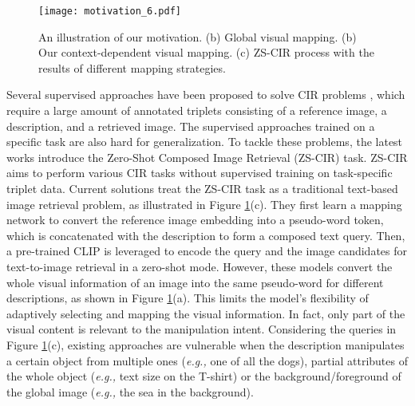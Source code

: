 \documentclass[letterpaper]{article} \usepackage{aaai24}  \usepackage{times}  \usepackage{helvet}  \usepackage{courier}  \usepackage[hyphens]{url}  \usepackage{graphicx} \urlstyle{rm} \def\UrlFont{\rm}  \usepackage{natbib}  \usepackage{caption} \frenchspacing  \setlength{\pdfpagewidth}{8.5in} \setlength{\pdfpageheight}{11in} \usepackage{algorithm}
\begin{document}
\begin{figure}[t]
\centering
    \texttt{[image: motivation\_6.pdf]}
    \caption{An illustration of our motivation. (b) Global visual mapping. (b) Our context-dependent visual mapping. (c) ZS-CIR process with the results of different mapping strategies.} 
\label{fig:motivation}
\end{figure}

Several supervised approaches have been proposed to solve CIR problems \cite{Chen_2020_CVPR, Liu_2021_ICCV, Goenka_2022_CVPR, Baldrati_2022_CVPR}, which require a large amount of annotated triplets consisting of a reference image, a description, and a retrieved image. The supervised approaches trained on a specific task are also hard for generalization. To tackle these problems, the latest works \cite{Saito_2023_CVPR, baldrati2023zero} introduce the Zero-Shot Composed Image Retrieval (ZS-CIR) task. ZS-CIR aims to perform various CIR tasks without supervised training on task-specific triplet data. Current solutions treat the ZS-CIR task as a traditional text-based image retrieval problem, as illustrated in Figure \ref{fig:motivation}(c). They first learn a mapping network to convert the reference image embedding into a pseudo-word token, which is concatenated with the description to form a composed text query. Then, a pre-trained CLIP is leveraged to encode the query and the image candidates for text-to-image retrieval in a zero-shot mode. However, these models convert the whole visual information of an image into the same pseudo-word for different descriptions, as shown in Figure \ref{fig:motivation}(a). This limits the model's flexibility of adaptively selecting and mapping the visual information. In fact, only part of the visual content is relevant to the manipulation intent. Considering the queries in Figure \ref{fig:motivation}(c), existing approaches are vulnerable when the description manipulates a certain object from multiple ones (\textit{e.g.,} one of all the dogs), partial attributes of the whole object (\textit{e.g.,} text size on the T-shirt) or the background/foreground of the global image (\textit{e.g.,} the sea in the background).    
\end{document}
